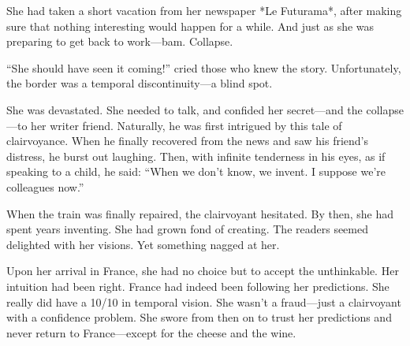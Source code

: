 {She had taken a short vacation from her newspaper *Le Futurama*, after making sure that nothing interesting would happen for a while. And just as she was preparing to get back to work—bam. Collapse.

“She should have seen it coming!” cried those who knew the story.
Unfortunately, the border was a temporal discontinuity—a blind spot.

She was devastated. She needed to talk, and confided her secret—and the collapse—to her writer friend. Naturally, he was first intrigued by this tale of clairvoyance. When he finally recovered from the news and saw his friend’s distress, he burst out laughing. Then, with infinite tenderness in his eyes, as if speaking to a child, he said:
“When we don’t know, we invent. I suppose we’re colleagues now.”

When the train was finally repaired, the clairvoyant hesitated. By then, she had spent years inventing. She had grown fond of creating. The readers seemed delighted with her visions. Yet something nagged at her.

Upon her arrival in France, she had no choice but to accept the unthinkable. Her intuition had been right. France had indeed been following her predictions. She really did have a 10/10 in temporal vision. She wasn’t a fraud—just a clairvoyant with a confidence problem.
She swore from then on to trust her predictions and never return to France—except for the cheese and the wine.}

